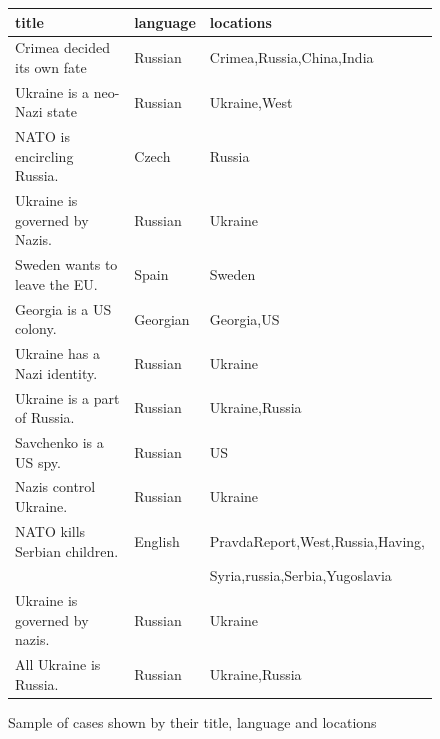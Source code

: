 \documentclass{article}
\begin{document}
\begin{figure}[H]
\caption{Sample of cases shown by their title, language and locations}
\label{fig:article_title_lang_loc}
\begin{tabular}{l | l | l }
        {\bf title } & {\bf language } & {\bf locations }\\ \hline
        Crimea decided its own fate & Russian & Crimea,Russia,China,India \\
        Ukraine is a neo-Nazi state & Russian & Ukraine,West \\
        NATO is encircling Russia. & Czech & Russia \\
        Ukraine is governed by Nazis. & Russian & Ukraine \\
        Sweden wants to leave the EU. & Spain & Sweden \\
        Georgia is a US colony. & Georgian & Georgia,US \\
        Ukraine has a Nazi identity. & Russian & Ukraine \\
        Ukraine is a part of Russia. & Russian & Ukraine,Russia \\
        Savchenko is a US spy. & Russian & US \\
        Nazis control Ukraine. & Russian & Ukraine \\
        NATO kills Serbian children. & English & PravdaReport,West,Russia,Having,\\
                                     &         & Syria,russia,Serbia,Yugoslavia \\
        Ukraine is governed by nazis. & Russian & Ukraine \\
        All Ukraine is Russia. & Russian & Ukraine,Russia \\
    \end{tabular}
\end{figure}
\end{document}
